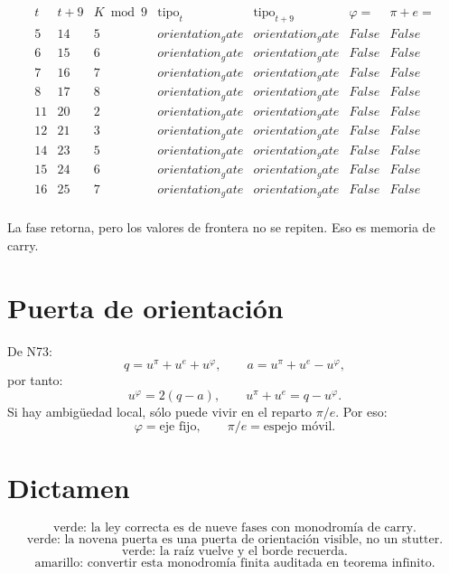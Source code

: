 \documentclass[11pt,a4paper]{article}
\begin{document}
\[
\begin{array}{c|c|c|c|c|c|c}
t&t+9&K\bmod9&\text{tipo}_t&\text{tipo}_{t+9}&\varphi=&\pi+e=\\
\hline
5 & 14 & 5 & orientation_gate & orientation_gate & False & False \\
6 & 15 & 6 & orientation_gate & orientation_gate & False & False \\
7 & 16 & 7 & orientation_gate & orientation_gate & False & False \\
8 & 17 & 8 & orientation_gate & orientation_gate & False & False \\
11 & 20 & 2 & orientation_gate & orientation_gate & False & False \\
12 & 21 & 3 & orientation_gate & orientation_gate & False & False \\
14 & 23 & 5 & orientation_gate & orientation_gate & False & False \\
15 & 24 & 6 & orientation_gate & orientation_gate & False & False \\
16 & 25 & 7 & orientation_gate & orientation_gate & False & False \\
\end{array}
\]

La fase retorna, pero los valores de frontera no se repiten. Eso es memoria de carry.

\section{Puerta de orientación}

De N73:
\[
q=u^\pi+u^e+u^\varphi,\qquad
a=u^\pi+u^e-u^\varphi,
\]
por tanto:
\[
\boxed{
u^\varphi=2(q-a),
\qquad
u^\pi+u^e=q-u^\varphi.
}
\]
Si hay ambigüedad local, sólo puede vivir en el reparto \(\pi/e\). Por eso:
\[
\boxed{
\varphi=\text{eje fijo},
\qquad
\pi/e=\text{espejo móvil}.
}
\]

\section{Dictamen}

\[
\boxed{
\text{verde: la ley correcta es de nueve fases con monodromía de carry.}
}
\]
\[
\boxed{
\text{verde: la novena puerta es una puerta de orientación visible, no un stutter.}
}
\]
\[
\boxed{
\text{verde: la raíz vuelve y el borde recuerda.}
}
\]
\[
\boxed{
\text{amarillo: convertir esta monodromía finita auditada en teorema infinito.}
}
\]
\end{document}
